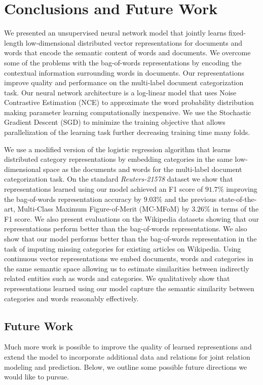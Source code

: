 \chapter{Conclusions and Future Work}
\label{chapter:conclusion}
We presented an unsupervised neural network model that jointly learns fixed-length low-dimensional distributed vector representations for documents and words that encode the semantic content of words and documents.
We overcome some of the problems with the bag-of-words representations by encoding the contextual information surrounding words in documents. Our representations improve quality and performance on the multi-label document categorization task.
Our neural network architecture is a log-linear model that uses Noise Contrastive Estimation (NCE) to approximate the word probability distribution making parameter learning computationally inexpensive. We use the Stochastic Gradient Descent (SGD) to minimize the training objective that allows parallelization of the learning task further decreasing training time many folds.

We use a modified version of the logistic regression algorithm that learns distributed category representations by embedding categories in the same low-dimensional space as the documents and words for the multi-label document categorization task. 
On the standard \emph{Reuters-21578} dataset we show that representations learned using our model achieved an F1 score of $91.7\%$ improving the bag-of-words representation accuracy by $9.03\%$ and the previous state-of-the-art, Multi-Class Maximum Figure-of-Merit (MC-MFoM) by $3.26\%$ in terms of the F1 score. 
We also present evaluations on the Wikipedia datasets showing that our representations perform better than the bag-of-words representations. We also show that our model performs better than the bag-of-words representation in the task of imputing missing categories for existing articles on Wikipedia.
Using continuous vector representations we embed documents, words and categories in the same semantic space allowing us to estimate similarities between indirectly related entities such as words and categories. We qualitatively show that representations learned using our model capture the semantic similarity between categories and words reasonably effectively.

\section{Future Work}
Much more work is possible to improve the quality of learned representions and extend the model to incorporate additional data and relations for joint relation modeling and prediction. Below, we outline some possible future directions we would like to pursue.  


